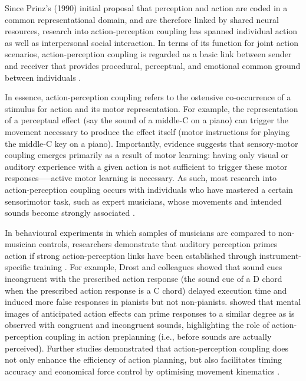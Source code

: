 Since Prinz’s (1990) initial proposal that perception and action are coded in a common representational domain, and are therefore linked by shared neural resources, research into action-perception coupling has spanned individual action as well as interpersonal social interaction.
In terms of its function for joint action scenarios, action-perception coupling is regarded as a basic link between sender and receiver that provides procedural, perceptual, and emotional common ground between individuals \citep{Rizzolatti1998}.

In essence, action-perception coupling refers to the ostensive co-occurrence of a stimulus for action and its motor representation.  For example, the representation of a perceptual effect (say the sound of a middle-C on a piano) can trigger the movement necessary to produce the effect itself (motor instructions for playing the middle-C key on a piano).   Importantly, evidence suggests that sensory-motor coupling emerges primarily as a result of motor learning: having only visual \citep{Candidi2014} or auditory \citep{Lahav2007} experience with a given action is not sufficient to trigger these motor responses—--active motor learning is necessary.  As such, most research into action-perception coupling occurs with individuals who have mastered a certain sensorimotor task, such as expert musicians, whose movements and intended sounds become strongly associated \citep{Novembre2014}.

In behavioural experiments in which samples of musicians are compared to non-musician controls, researchers demonstrate that auditory perception primes action if strong action-perception links have been established through instrument-specific training \citep{Drost2005,Drost2005a,Drost2007}.  For example, Drost and colleagues showed that sound cues incongruent with the prescribed action response (the sound cue of a D chord when the prescribed action response is a C chord) delayed execution time \citep{Drost2005} and induced more false responses \citep[i.e., production of the heard chord, instead of the imperative one,][]{Drost2005a} in pianists but not non-pianists.  \textcite{Keller2006} showed that mental images of anticipated action effects can prime responses to a similar degree as is observed with congruent and incongruent sounds, highlighting the role of action-perception coupling in action preplanning (i.e., before sounds are actually perceived).  Further studies demonstrated that action-perception coupling does not only enhance the efficiency of action planning, but also facilitates timing accuracy and economical force control by optimising movement kinematics \citep{Keller2010}.

